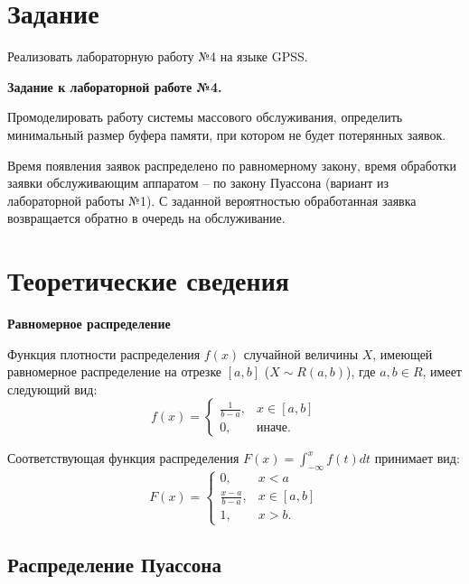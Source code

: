 \documentclass[14pt, a4paper]{extarticle}
\begin{document}


\setcounter{page}{2}

\section{Задание}

Реализовать лабораторную работу №4 на языке GPSS.

\textbf{Задание к лабораторной работе №4.}

Промоделировать работу системы массового обслуживания, определить минимальный размер буфера памяти, при котором не будет потерянных заявок. 

Время появления заявок распределено по равномерному закону, время обработки заявки обслуживающим аппаратом -- по закону Пуассона (вариант из лабораторной работы №1). С заданной вероятностью обработанная заявка возвращается обратно в очередь на обслуживание.



\section{Теоретические сведения}

\textbf{Равномерное распределение}

Функция плотности распределения $f(x)$ случайной величины $X$, имеющей равномерное распределение на отрезке $[a, b]$ ($X \sim R(a, b)$), где $a, b \in R$, имеет следующий вид:
\begin{equation}
	f(x)=\begin{cases}
		\frac{1}{b - a}, & x \in [a, b] \\
		0, & \text{иначе}.
	\end{cases}
\end{equation}

Соответствующая функция распределения $F(x) = \int_{-\infty}^{x}f(t)dt$ принимает вид: 
\begin{equation}
	F(x)=\begin{cases}
		0, & x < a \\
		\frac{x - a}{b - a}, & x \in [a, b] \\
		1, & x > b.
	\end{cases}
\end{equation}


\subsection{Распределение Пуассона}
\end{document}
